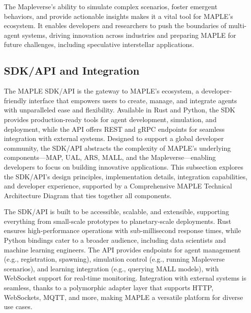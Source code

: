 \documentclass[a4paper,11pt]{article}
\begin{document}
The Mapleverse’s ability to simulate complex scenarios, foster emergent behaviors, and provide actionable insights makes it a vital tool for MAPLE’s ecosystem. It enables developers and researchers to push the boundaries of multi-agent systems, driving innovation across industries and preparing MAPLE for future challenges, including speculative interstellar applications.

\pagebreak

\subsection{SDK/API and Integration}
The MAPLE SDK/API is the gateway to MAPLE’s ecosystem, a developer-friendly interface that empowers users to create, manage, and integrate agents with unparalleled ease and flexibility. Available in Rust and Python, the SDK provides production-ready tools for agent development, simulation, and deployment, while the API offers REST and gRPC endpoints for seamless integration with external systems. Designed to support a global developer community, the SDK/API abstracts the complexity of MAPLE’s underlying components—MAP, UAL, ARS, MALL, and the Mapleverse—enabling developers to focus on building innovative applications. This subsection explores the SDK/API’s design principles, implementation details, integration capabilities, and developer experience, supported by a Comprehensive MAPLE Technical Architecture Diagram that ties together all components.

The SDK/API is built to be accessible, scalable, and extensible, supporting everything from small-scale prototypes to planetary-scale deployments. Rust ensures high-performance operations with sub-millisecond response times, while Python bindings cater to a broader audience, including data scientists and machine learning engineers. The API provides endpoints for agent management (e.g., registration, spawning), simulation control (e.g., running Mapleverse scenarios), and learning integration (e.g., querying MALL models), with WebSocket support for real-time monitoring. Integration with external systems is seamless, thanks to a polymorphic adapter layer that supports HTTP, WebSockets, MQTT, and more, making MAPLE a versatile platform for diverse use cases.
\end{document}
